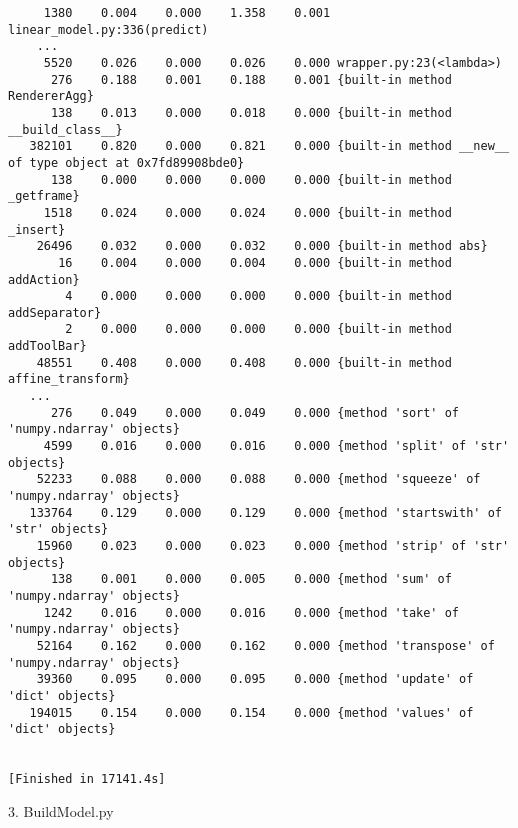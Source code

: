 \documentclass{article}
\begin{document}
\begin{verbatim}
     1380    0.004    0.000    1.358    0.001 linear_model.py:336(predict)
    ...
     5520    0.026    0.000    0.026    0.000 wrapper.py:23(<lambda>)
      276    0.188    0.001    0.188    0.001 {built-in method RendererAgg}
      138    0.013    0.000    0.018    0.000 {built-in method __build_class__}
   382101    0.820    0.000    0.821    0.000 {built-in method __new__ of type object at 0x7fd89908bde0}
      138    0.000    0.000    0.000    0.000 {built-in method _getframe}
     1518    0.024    0.000    0.024    0.000 {built-in method _insert}
    26496    0.032    0.000    0.032    0.000 {built-in method abs}
       16    0.004    0.000    0.004    0.000 {built-in method addAction}
        4    0.000    0.000    0.000    0.000 {built-in method addSeparator}
        2    0.000    0.000    0.000    0.000 {built-in method addToolBar}
    48551    0.408    0.000    0.408    0.000 {built-in method affine_transform}
   ...
      276    0.049    0.000    0.049    0.000 {method 'sort' of 'numpy.ndarray' objects}
     4599    0.016    0.000    0.016    0.000 {method 'split' of 'str' objects}
    52233    0.088    0.000    0.088    0.000 {method 'squeeze' of 'numpy.ndarray' objects}
   133764    0.129    0.000    0.129    0.000 {method 'startswith' of 'str' objects}
    15960    0.023    0.000    0.023    0.000 {method 'strip' of 'str' objects}
      138    0.001    0.000    0.005    0.000 {method 'sum' of 'numpy.ndarray' objects}
     1242    0.016    0.000    0.016    0.000 {method 'take' of 'numpy.ndarray' objects}
    52164    0.162    0.000    0.162    0.000 {method 'transpose' of 'numpy.ndarray' objects}
    39360    0.095    0.000    0.095    0.000 {method 'update' of 'dict' objects}
   194015    0.154    0.000    0.154    0.000 {method 'values' of 'dict' objects}


[Finished in 17141.4s]
\end{verbatim}
3. BuildModel.py
\begin{verbatim}

\end{verbatim}
\end{document}
